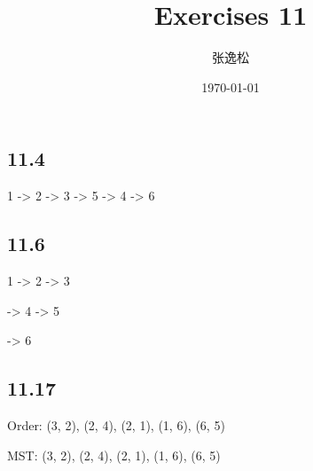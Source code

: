 \documentclass[12pt]{ctexart}
\title{Exercises 11}
\author{张逸松}
\date{\today}
\begin{document}
    \maketitle
    \subsection*{11.4}
    1 -> 2 -> 3 -> 5 -> 4 -> 6
    \subsection*{11.6}
    1 -> 2 -> 3 \par
    \quad -> 4 -> 5 \par
    \quad -> 6
    \subsection*{11.17}
    Order: (3, 2), (2, 4), (2, 1), (1, 6), (6, 5) \par
    MST: (3, 2), (2, 4), (2, 1), (1, 6), (6, 5)
\end{document}
